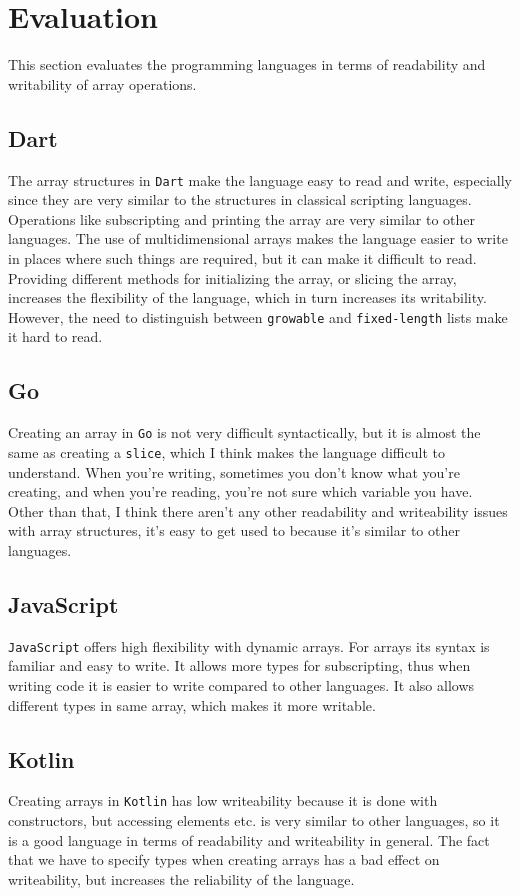 \documentclass{article}
\begin{document}
\section{Evaluation}

This section evaluates the programming languages in terms of readability and writability of array operations.

\subsection{Dart} 
The array structures in \texttt{Dart} make the language easy to read and write, especially since they are very similar to the structures in classical scripting languages. Operations like subscripting and printing the array are very similar to other languages. 
The use of multidimensional arrays makes the language easier to write in places where such things are required, but it can make it difficult to read. Providing different methods for initializing the array, or slicing the array, increases the flexibility of the language, which in turn increases its writability.  However, the need to distinguish between \texttt{growable} and \texttt{fixed-length} lists make it hard to read.

\subsection{Go}
Creating an array in \texttt{Go} is not very difficult syntactically, but it is almost the same as creating a \texttt{slice}, which I think makes the language difficult to understand. When you're writing, sometimes you don't know what you're creating, and when you're reading, you're not sure which variable you have. Other than that, I think there aren't any other readability and writeability issues with array structures, it's easy to get used to because it's similar to other languages. 

\subsection{JavaScript}
\texttt{JavaScript} offers high flexibility with dynamic arrays. For arrays its syntax is familiar and easy to write. It allows more types for subscripting, thus when writing code it is easier to write compared to other languages. It also allows different types in same array, which makes it more writable.

\subsection{Kotlin}
Creating arrays in \texttt{Kotlin} has low writeability because it is done with constructors, but accessing elements etc. is very similar to other languages, so it is a good language in terms of readability and writeability in general. The fact that we have to specify types when creating arrays has a bad effect on writeability, but increases the reliability of the language.
\end{document}
